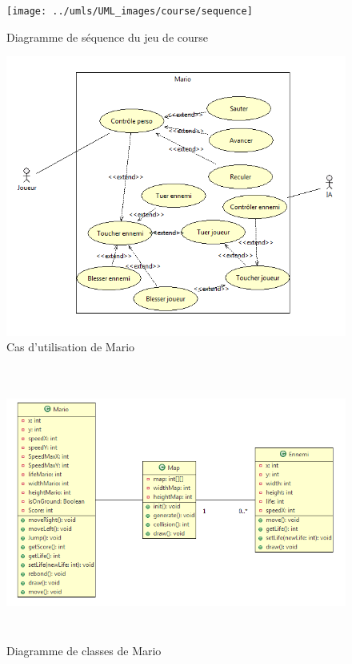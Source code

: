 \begin{figure}[h]
 \centering
 \texttt{[image: ../umls/UML\_images/course/sequence]} \hfill
 \caption{Diagramme de séquence du jeu de course}
\end{figure}

\clearpage

\begin{figure}[h]
 \centering
 \includegraphics[width=\textwidth]{../umls/UML_images/Mario/Utilisation} \hfill
 \caption{Cas d'utilisation de Mario}
\end{figure}

\begin{figure}[h]
 \centering
 \includegraphics[height=9cm]{../umls/UML_images/Mario/Class} \hfill
 \caption{Diagramme de classes de Mario}
\end{figure}

